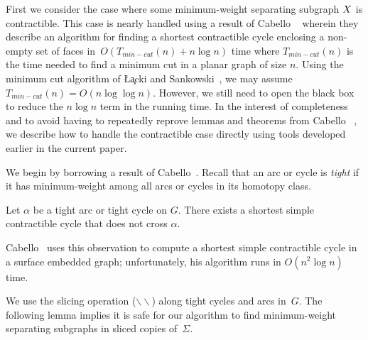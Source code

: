 \documentclass[letterpaper,review]{siamart190516}
\def\snip{\mathbin{\raisebox{0.15ex}{\rotatebox[origin=c]{60}{\Rightscissors}\!}}}
\def\snip{\mathbin{\backslash\!\!\backslash}}
\begin{document}
{First we consider the case where some minimum-weight separating subgraph $X$ is contractible.  
This case is nearly handled using a result of Cabello \etal~\cite[Theorem 5.4]{cdem-fotc-10} wherein
they describe an algorithm for finding a shortest contractible cycle enclosing a non-empty set of
faces in~\(O(T_{min-cut}(n) + n \log n)\) time where \(T_{min-cut}(n)\) is the time needed to find a
minimum cut in a planar graph of size \(n\).
Using the minimum cut algorithm of \L\c{a}cki and Sankowski~\cite{ls-mcsc-11}, we may assume
\(T_{min-cut}(n) = O(n \log \log n)\).
However, we still need to open the black box to reduce the \(n \log n\) term in the running time.
In the interest of completeness and to avoid having to repeatedly reprove lemmas and theorems from
Cabello \etal~\cite{cdem-fotc-10}, we describe how to handle the contractible case directly using
tools developed earlier in the current paper.

We begin by borrowing a result of Cabello~\cite[Lemma 4.1]{c-fscss-10}.
Recall that an arc or cycle is \emph{tight} if it has minimum-weight among all arcs or cycles in its homotopy class.

\begin{lemma}
\label{lem:disjoint-tight-arc}
Let $\alpha$ be a tight arc or tight cycle on $G$.  There exists a shortest simple contractible cycle that does not cross $\alpha$.
\end{lemma}

Cabello~\cite{c-fscss-10} uses this observation to compute a shortest simple contractible cycle in a surface embedded graph; unfortunately, his algorithm runs in $O(n^2\log n)$ time.

We use the slicing operation ($\snip$) along tight cycles and arcs in~$G$.  The following lemma
implies it is safe for our algorithm to find minimum-weight separating subgraphs in sliced copies
of~$\Sigma$.

}
\end{document}

